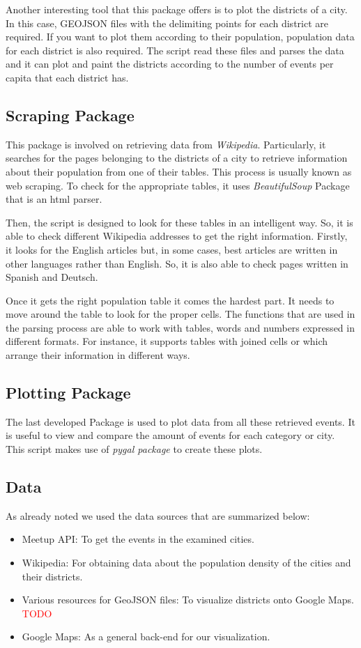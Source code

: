 Another interesting tool that this package offers is to plot the districts of a city. In this case, GEOJSON files with the delimiting points for each district are required. If you want to plot them according to their population, population data for each district is also required. The script read these files and parses the data and it can plot and paint the districts according to the number of events per capita that each district has.

\subsection{Scraping Package}
This package is involved on retrieving data from \textit{Wikipedia}. Particularly, it searches for the pages belonging to the districts of a city to retrieve information about their population from one of their tables. This process is usually known as web scraping. To check for the appropriate tables, it uses \textit{BeautifulSoup} Package that is an html parser.

Then, the script is designed to look for these tables in an intelligent way.  So, it is able to check different Wikipedia addresses to get the right information.  Firstly, it looks for the English articles but, in some cases, best articles are written in other languages rather than English. So, it is also able to check pages written in Spanish and Deutsch.

Once it gets the right population table it comes the hardest part. It needs to move around the table to look for the proper cells. The functions that are used in the parsing process are able to work with tables, words and numbers expressed in different formats. For instance, it supports tables with joined cells or which arrange their information in different ways.

\subsection{Plotting Package}
The last developed Package is used to plot data from all these retrieved events. It is useful to view and compare the amount of events for each category or city. This script makes use of \textit{pygal package} to create these plots. 

\subsection{Data}

As already noted we used the data sources that are summarized below:

\begin{itemize}
\item Meetup API: To get the events in the examined cities. 
\item Wikipedia: For obtaining data about the population density of the cities and their districts. 
\item Various resources for GeoJSON files: To visualize districts onto Google Maps. \textcolor{red}{TODO}
\item Google Maps: As a general back-end for our visualization.  
\end{itemize}
